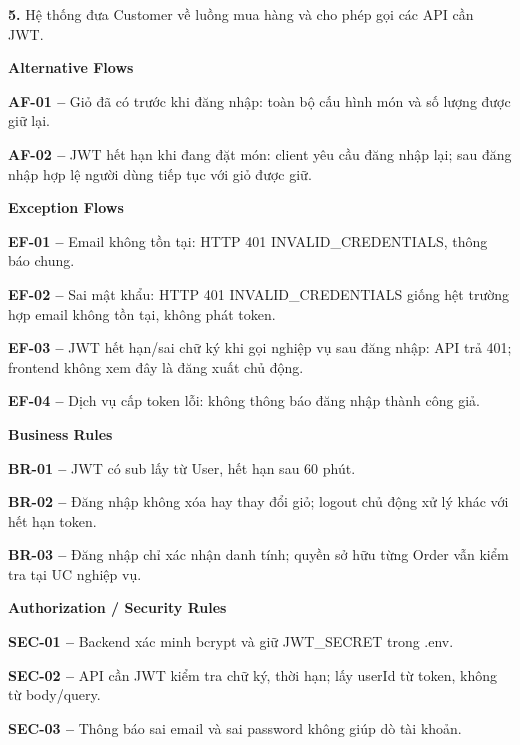 \documentclass[11pt,a4paper,oneside]{report}
\begin{document}
\textbf{5.} Hệ thống đưa Customer về luồng mua hàng và cho phép gọi các API cần JWT.
\par

\par\smallskip\noindent\textcolor{sgublue}{\textbf{Alternative Flows}}\par\nobreak
\textbf{AF-01 --} Giỏ đã có trước khi đăng nhập: toàn bộ cấu hình món và số lượng được giữ lại.

\textbf{AF-02 --} JWT hết hạn khi đang đặt món: client yêu cầu đăng nhập lại; sau đăng nhập hợp lệ người dùng tiếp tục với giỏ được giữ.
\par

\par\smallskip\noindent\textcolor{sgublue}{\textbf{Exception Flows}}\par\nobreak
\textbf{EF-01 --} Email không tồn tại: HTTP 401 INVALID\_CREDENTIALS, thông báo chung.

\textbf{EF-02 --} Sai mật khẩu: HTTP 401 INVALID\_CREDENTIALS giống hệt trường hợp email không tồn tại, không phát token.

\textbf{EF-03 --} JWT hết hạn/sai chữ ký khi gọi nghiệp vụ sau đăng nhập: API trả 401; frontend không xem đây là đăng xuất chủ động.

\textbf{EF-04 --} Dịch vụ cấp token lỗi: không thông báo đăng nhập thành công giả.
\par

\par\smallskip\noindent\textcolor{sgublue}{\textbf{Business Rules}}\par\nobreak
\textbf{BR-01 --} JWT có sub lấy từ User, hết hạn sau 60 phút.

\textbf{BR-02 --} Đăng nhập không xóa hay thay đổi giỏ; logout chủ động xử lý khác với hết hạn token.

\textbf{BR-03 --} Đăng nhập chỉ xác nhận danh tính; quyền sở hữu từng Order vẫn kiểm tra tại UC nghiệp vụ.
\par

\par\smallskip\noindent\textcolor{sgublue}{\textbf{Authorization / Security Rules}}\par\nobreak
\textbf{SEC-01 --} Backend xác minh bcrypt và giữ JWT\_SECRET trong .env.

\textbf{SEC-02 --} API cần JWT kiểm tra chữ ký, thời hạn; lấy userId từ token, không từ body/query.

\textbf{SEC-03 --} Thông báo sai email và sai password không giúp dò tài khoản.
\par
\end{document}
